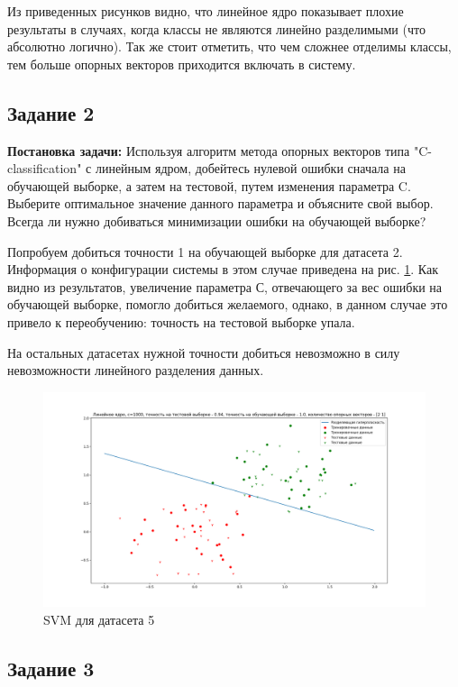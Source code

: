 \documentclass[a4paper,14pt]{article}
\begin{document}
Из приведенных рисунков видно, что линейное ядро показывает плохие результаты в случаях, когда классы не являются линейно разделимыми (что абсолютно логично). Так же стоит отметить, что чем сложнее отделимы классы, тем больше опорных векторов приходится включать в систему.

\subsection{Задание 2}

\textbf{Постановка задачи:}
Используя алгоритм метода опорных векторов типа "C-classification" с линейным ядром, добейтесь нулевой ошибки сначала на обучающей выборке, а затем на тестовой, путем изменения параметра C. Выберите оптимальное значение данного параметра и объясните свой выбор. Всегда ли нужно добиваться минимизации ошибки на обучающей выборке?

Попробуем добиться точности 1 на обучающей выборке для датасета 2. Информация о конфигурации системы в этом случае приведена на рис. \ref{graph:task_2_train_acc}. Как видно из результатов, увеличение параметра С, отвечающего за вес ошибки на обучающей выборке, помогло добиться желаемого, однако, в данном случае это привело к переобучению: точность на тестовой выборке упала.

На остальных датасетах нужной точности добиться невозможно в силу невозможности линейного разделения данных. 

\begin{figure}[H]
\includegraphics[width=\textwidth, keepaspectratio]{task_2c1000.png}
\caption{SVM для датасета 5}
\label{graph:task_2_train_acc}
\end{figure}

\subsection{Задание 3}
\end{document}
